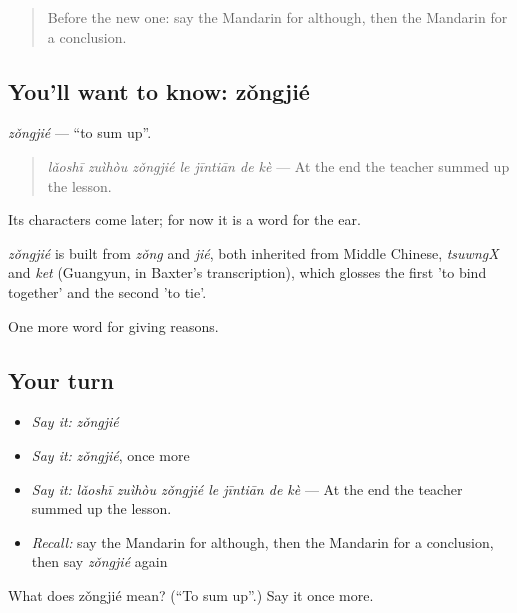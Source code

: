 \label{lesson:ZH-C371-zongjie}



\begin{quote}
Before the new one: say the Mandarin for although, then the Mandarin for a conclusion.
\end{quote}

\subsection*{You'll want to know: zǒngjié}
\emph{zǒngjié} — \textquotedblleft{}to sum up\textquotedblright{}.

\begin{quote}
\emph{lǎoshī zuìhòu zǒngjié le jīntiān de kè} — At the end the teacher summed up the lesson.
\end{quote}

Its characters come later; for now it is a word for the ear.

\begin{cousinweb}
\emph{zǒngjié} is built from \emph{zǒng} and \emph{jié}, both inherited from Middle Chinese, \emph{tsuwngX} and \emph{ket} (Guangyun, in Baxter's transcription), which glosses the first 'to bind together' and the second 'to tie'.
\end{cousinweb}

\begin{grammarlens}[title={What you've built}]
One more word for giving reasons.
\end{grammarlens}

\subsection*{Your turn}
\begin{itemize}
\raggedright
  \item \emph{Say it:} \emph{zǒngjié}
  \item \emph{Say it:} \emph{zǒngjié}, once more
  \item \emph{Say it:} \emph{lǎoshī zuìhòu zǒngjié le jīntiān de kè} — At the end the teacher summed up the lesson.
  \item \emph{Recall:} say the Mandarin for although, then the Mandarin for a conclusion, then say \emph{zǒngjié} again
\end{itemize}

\begin{tcolorbox}[breakable,colback=teal!4,colframe=teal!35!black,title={Before you move on}]
What does zǒngjié mean? (\textquotedblleft{}To sum up\textquotedblright{}.) Say it once more.
\end{tcolorbox}
